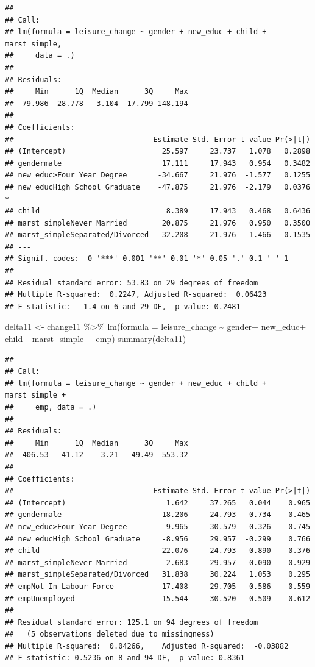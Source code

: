 \documentclass[
]{article}
\newenvironment{Shaded}{\begin{snugshade}}{\end{snugshade}}
\newcommand{\AttributeTok}[1]{\textcolor[rgb]{0.77,0.63,0.00}{#1}}
\newcommand{\FunctionTok}[1]{\textcolor[rgb]{0.00,0.00,0.00}{#1}}
\newcommand{\NormalTok}[1]{#1}
\newcommand{\OtherTok}[1]{\textcolor[rgb]{0.56,0.35,0.01}{#1}}
\newcommand{\SpecialCharTok}[1]{\textcolor[rgb]{0.00,0.00,0.00}{#1}}
\begin{document}
\begin{verbatim}
## 
## Call:
## lm(formula = leisure_change ~ gender + new_educ + child + marst_simple, 
##     data = .)
## 
## Residuals:
##     Min      1Q  Median      3Q     Max 
## -79.986 -28.778  -3.104  17.799 148.194 
## 
## Coefficients:
##                                Estimate Std. Error t value Pr(>|t|)  
## (Intercept)                      25.597     23.737   1.078   0.2898  
## gendermale                       17.111     17.943   0.954   0.3482  
## new_educ>Four Year Degree       -34.667     21.976  -1.577   0.1255  
## new_educHigh School Graduate    -47.875     21.976  -2.179   0.0376 *
## child                             8.389     17.943   0.468   0.6436  
## marst_simpleNever Married        20.875     21.976   0.950   0.3500  
## marst_simpleSeparated/Divorced   32.208     21.976   1.466   0.1535  
## ---
## Signif. codes:  0 '***' 0.001 '**' 0.01 '*' 0.05 '.' 0.1 ' ' 1
## 
## Residual standard error: 53.83 on 29 degrees of freedom
## Multiple R-squared:  0.2247, Adjusted R-squared:  0.06423 
## F-statistic:   1.4 on 6 and 29 DF,  p-value: 0.2481
\end{verbatim}

\begin{Shaded}
\begin{Highlighting}[]
\NormalTok{delta11 }\OtherTok{\textless{}{-}}\NormalTok{ change11 }\SpecialCharTok{\%\textgreater{}\%}
  \FunctionTok{lm}\NormalTok{(}\AttributeTok{formula =}\NormalTok{ leisure\_change }\SpecialCharTok{\textasciitilde{}}\NormalTok{ gender}\SpecialCharTok{+}\NormalTok{ new\_educ}\SpecialCharTok{+}\NormalTok{ child}\SpecialCharTok{+}\NormalTok{ marst\_simple }\SpecialCharTok{+}\NormalTok{ emp)}
\FunctionTok{summary}\NormalTok{(delta11)}
\end{Highlighting}
\end{Shaded}

\begin{verbatim}
## 
## Call:
## lm(formula = leisure_change ~ gender + new_educ + child + marst_simple + 
##     emp, data = .)
## 
## Residuals:
##     Min      1Q  Median      3Q     Max 
## -406.53  -41.12   -3.21   49.49  553.32 
## 
## Coefficients:
##                                Estimate Std. Error t value Pr(>|t|)
## (Intercept)                       1.642     37.265   0.044    0.965
## gendermale                       18.206     24.793   0.734    0.465
## new_educ>Four Year Degree        -9.965     30.579  -0.326    0.745
## new_educHigh School Graduate     -8.956     29.957  -0.299    0.766
## child                            22.076     24.793   0.890    0.376
## marst_simpleNever Married        -2.683     29.957  -0.090    0.929
## marst_simpleSeparated/Divorced   31.838     30.224   1.053    0.295
## empNot In Labour Force           17.408     29.705   0.586    0.559
## empUnemployed                   -15.544     30.520  -0.509    0.612
## 
## Residual standard error: 125.1 on 94 degrees of freedom
##   (5 observations deleted due to missingness)
## Multiple R-squared:  0.04266,    Adjusted R-squared:  -0.03882 
## F-statistic: 0.5236 on 8 and 94 DF,  p-value: 0.8361
\end{verbatim}
\end{document}

